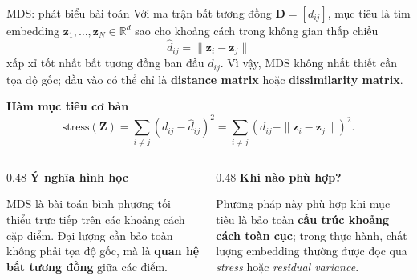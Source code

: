 \begin{frame}[shrink=4]{MDS: phát biểu bài toán}
    \small
    Với ma trận bất tương đồng $\mathbf{D}=[d_{ij}]$, mục tiêu là tìm embedding $\mathbf{z}_1,\ldots,\mathbf{z}_N\in\mathbb{R}^d$ sao cho khoảng cách trong không gian thấp chiều
    \[
        \hat d_{ij}=\|\mathbf{z}_i-\mathbf{z}_j\|
    \]
    xấp xỉ tốt nhất bất tương đồng ban đầu $d_{ij}$. Vì vậy, MDS không nhất thiết cần tọa độ gốc; đầu vào có thể chỉ là \textbf{distance matrix} hoặc \textbf{dissimilarity matrix}.

    \vspace{0.12cm}
    {\bfseries Hàm mục tiêu cơ bản}
    \[
        \mathrm{stress}(\mathbf{Z})
        =
        \sum_{i\neq j}\left(d_{ij}-\hat d_{ij}\right)^2
        =
        \sum_{i\neq j}\left(d_{ij}-\|\mathbf{z}_i-\mathbf{z}_j\|\right)^2.
    \]

    \vspace{0.12cm}
    \begin{columns}[T,onlytextwidth]
        \begin{column}{0.48\textwidth}
            {\bfseries Ý nghĩa hình học}

            MDS là bài toán bình phương tối thiểu trực tiếp trên các khoảng cách cặp điểm. Đại lượng cần bảo toàn không phải tọa độ gốc, mà là \textbf{quan hệ bất tương đồng} giữa các điểm.
        \end{column}
        \begin{column}{0.48\textwidth}
            {\bfseries Khi nào phù hợp?}

            Phương pháp này phù hợp khi mục tiêu là bảo toàn \textbf{cấu trúc khoảng cách toàn cục}; trong thực hành, chất lượng embedding thường được đọc qua \textit{stress} hoặc \textit{residual variance}.
        \end{column}
    \end{columns}

    \hfill{\scriptsize \cite{duchesnay2021statsml}}
\end{frame}

